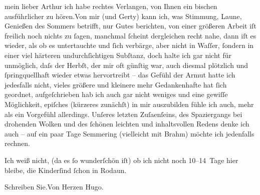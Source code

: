 \pstart{}mein lieber Arthur \pend\vspace{0.5em}
\pstart
           ich habe rechtes Verlangen, von Ihnen ein bischen ausführlicher zu hören.\hspace*{1.5em}Von mir (und Gerty) kann ich, was Stimmung, Laune, Genießen des Sommers betrifft, nur
               Gutes berichten, von einer größeren Arbeit iſt freilich noch nichts zu ſagen,
               manchmal {\pb}ſcheint dergleichen
               recht nahe, dann iſt es wieder, als ob es untertauchte und ſich verbärge, aber nicht
               in Waſſer, ſondern in einer viel härteren undurchſichtigen Subſtanz, doch halte ich
               gar nicht für unmöglich, daſs der Herbſt, der mir oft günſtig war, auch diesmal
               plötzlich und ſpringquellhaft wieder etwas {\pb}hervortreibt – das Gefühl der
               Armut hatte ich jedesfalls nicht, vieles größere und kleinere mehr Gedankenhafte hat
               ſich geordnet, aufgeſchrieben hab ich auch gar nicht weniges und eine gewiſſe
               Möglichkeit, epiſches (kürzeres zunächſt) in mir auszubilden fühle ich auch, mehr als
               ein Vorgefühl {\pb}allerdings. Unſeres
               letzten Zuſa{\geminationm}enſeins, des Spaziergangs bei drohenden
               Wolken und des ſchönen leichten und inhaltsvollen Redens denke ich auch – auf ein
               paar Tage Semmering (vielleicht mit Brahm) möchte ich jedenfalls rechnen.\pend
           
\pstart
           Ich weiß nicht, (da es ſo wunderſchön iſt) ob ich nicht noch 10–14 Tage hier bleibe,
               die Kinderſind ſchon in Rodaun.\pend
           
\pstart
            Schreiben Sie.\hspace*{1.5em}Von Herzen\pend
           \pstart \spacefill\mbox{Hugo.}\pend{}\endnumbering{}  
      
